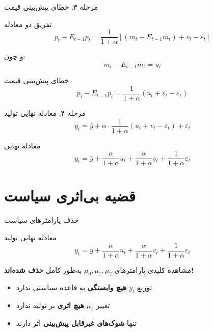 \documentclass[aspectratio=169,11pt]{beamer}
\newcommand{\highlight}[1]{\textcolor{AccentOrange}{\textbf{#1}}}
\newcommand{\important}[1]{\textcolor{AlertRed}{\textbf{#1}}}
\newcommand{\keyword}[1]{\textcolor{MainBlue}{\textbf{#1}}}
\begin{document}
\begin{frame}{مرحله ۳: خطای پیش‌بینی قیمت}
	\begin{block}{تفریق دو معادله}
		\[
			p_t - E_{t-1}p_t = \frac{1}{1+\alpha}\left[(m_t - E_{t-1}m_t) + v_t - \varepsilon_t\right]
		\]
	\end{block}
	\vspace{0.3cm}
	و چون:
	\[
		m_t - E_{t-1}m_t = u_t
	\]
	\vspace{0.3cm}
	\begin{alertblock}{خطای پیش‌بینی قیمت}
		\centering
		\[
			p_t - E_{t-1}p_t = \frac{1}{1+\alpha}(u_t + v_t - \varepsilon_t)
		\]
	\end{alertblock}
\end{frame}

\begin{frame}{مرحله ۴: معادله نهایی تولید}
	\[
		y_t = \bar{y} + \alpha \cdot \frac{1}{1+\alpha}(u_t + v_t - \varepsilon_t) + \varepsilon_t
	\]
	\vspace{0.5cm}
	\begin{block}{معادله نهایی}
		\centering
		\Large
		\[
			\boxed{y_t = \bar{y} + \frac{\alpha}{1+\alpha}u_t + \frac{\alpha}{1+\alpha}v_t + \frac{1}{1+\alpha}\varepsilon_t}
		\]
	\end{block}
\end{frame}

\section{قضیه بی‌اثری سیاست}

\begin{frame}{حذف پارامترهای سیاست}
	\begin{block}{معادله نهایی تولید}
		\[
			y_t = \bar{y} + \frac{\alpha}{1+\alpha}u_t + \frac{\alpha}{1+\alpha}v_t + \frac{1}{1+\alpha}\varepsilon_t
		\]
	\end{block}
	\vspace{0.3cm}
	\begin{alertblock}{مشاهده کلیدی}
		\centering
		\large
		پارامترهای $\mu_0, \mu_1, \mu_2$ به‌طور کامل \important{حذف شده‌اند!}
	\end{alertblock}
	\vspace{0.3cm}
	\begin{itemize}
		\item توزیع $y_t$ \keyword{هیچ وابستگی} به قاعده سیاستی ندارد
		\item تغییر $\mu_1$ \important{هیچ اثری} بر تولید ندارد
		\item تنها \highlight{شوک‌های غیرقابل پیش‌بینی} اثر دارند
	\end{itemize}
\end{frame}
\end{document}
